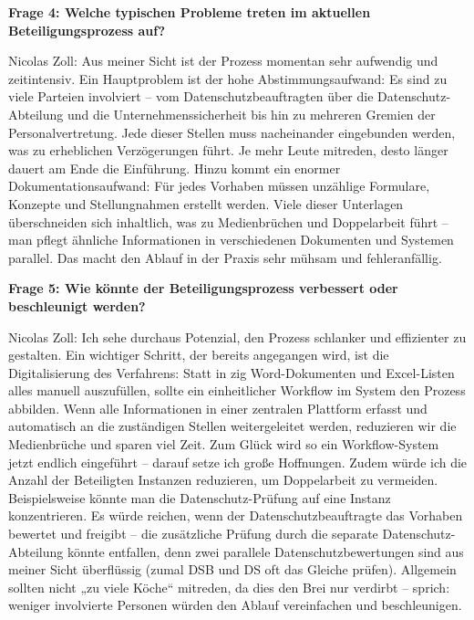 \documentclass[
    12pt, 
    a4paper,
    ]{scrartcl} %
\begin{document}
\textbf{Frage 4: Welche typischen Probleme treten im aktuellen Beteiligungsprozess auf?}

Nicolas Zoll: Aus meiner Sicht ist der Prozess momentan sehr aufwendig und zeitintensiv. Ein Hauptproblem ist der hohe Abstimmungsaufwand: Es sind zu viele Parteien involviert – vom Datenschutzbeauftragten über die Datenschutz-Abteilung und die Unternehmenssicherheit bis hin zu mehreren Gremien der Personalvertretung. Jede dieser Stellen muss nacheinander eingebunden werden, was zu erheblichen Verzögerungen führt. Je mehr Leute mitreden, desto länger dauert am Ende die Einführung. Hinzu kommt ein enormer Dokumentationsaufwand: Für jedes Vorhaben müssen unzählige Formulare, Konzepte und Stellungnahmen erstellt werden. Viele dieser Unterlagen überschneiden sich inhaltlich, was zu Medienbrüchen und Doppelarbeit führt – man pflegt ähnliche Informationen in verschiedenen Dokumenten und Systemen parallel. Das macht den Ablauf in der Praxis sehr mühsam und fehleranfällig.

\textbf{Frage 5: Wie könnte der Beteiligungsprozess verbessert oder beschleunigt werden?}

Nicolas Zoll: Ich sehe durchaus Potenzial, den Prozess schlanker und effizienter zu gestalten. Ein wichtiger Schritt, der bereits angegangen wird, ist die Digitalisierung des Verfahrens: Statt in zig Word-Dokumenten und Excel-Listen alles manuell auszufüllen, sollte ein einheitlicher Workflow im System den Prozess abbilden. Wenn alle Informationen in einer zentralen Plattform erfasst und automatisch an die zuständigen Stellen weitergeleitet werden, reduzieren wir die Medienbrüche und sparen viel Zeit. Zum Glück wird so ein Workflow-System jetzt endlich eingeführt – darauf setze ich große Hoffnungen. Zudem würde ich die Anzahl der Beteiligten Instanzen reduzieren, um Doppelarbeit zu vermeiden. Beispielsweise könnte man die Datenschutz-Prüfung auf eine Instanz konzentrieren. Es würde reichen, wenn der Datenschutzbeauftragte das Vorhaben bewertet und freigibt – die zusätzliche Prüfung durch die separate Datenschutz-Abteilung könnte entfallen, denn zwei parallele Datenschutzbewertungen sind aus meiner Sicht überflüssig (zumal DSB und DS oft das Gleiche prüfen). Allgemein sollten nicht „zu viele Köche“ mitreden, da dies den Brei nur verdirbt – sprich: weniger involvierte Personen würden den Ablauf vereinfachen und beschleunigen.
\end{document}
